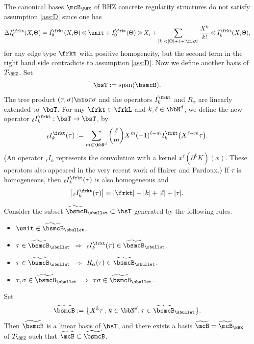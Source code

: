 The canonical bases $\mcB_{\BHZ}$ of BHZ concrete regularity structures do not satisfy assumption \eqref{ass:D} since one has
\[
\Delta I^{\frkt}_0(X_i\Theta) = I^{\frkt}_0(X_i\Theta)\otimes\unit + I^{\frkt}_0(\Theta)\otimes X_i + \sum_{\vert k\vert< \vert\Theta\vert+1+\vert\frkt\vert}\frac{X^k}{k!}\otimes I^{\frkt}_k(X_i\Theta),
\]
for any edge type $\frkt$ with positive homogeneity, but the second term in the right hand side contradicts to assumption \eqref{ass:D}.
Now we define another basis of $T_{\BHZ}$. Set\vspace*{-3pt}
\[
\bsT := \textrm{span}(\bsmcB).
\]
The tree product $(\tau,\sigma)\mto\tau\sigma$ and the operators $I_k^\frkt$ and $R_\alpha$ are linearly extended to~$\bsT$. For any $\frkt\in\frkL$ and $k,\ell\in\bbN^d$, we define the new operator ${}_\ell I_k^\frkt:\bsT\to \bsT$, by\vspace*{-3pt}
\[
{}_\ell I_k^\frkt(\tau) := \sum_{m\in\bbN^d}\binom{\ell}{m}X^m(-1)^{\ell-m}I_k^\frkt\bigl(X^{\ell-m}\tau\bigr).
\]
(An operator ${}_\ell I_k$ represents the convolution with a kernel $x^\ell(\partial^k K)(x)$. These oper\-ators also appeared in the very recent work \cite{HP19} of Hairer and Pardoux.) If $\tau$ is homogeneous, then ${}_\ell I_k^\frkt(\tau)$ is also homogeneous and\vspace*{-3pt}
\[
\big|{}_\ell I_k^\frkt(\tau)\big| = |\frkt| - |k| + |\ell | + |\tau|.
\]

\begin{lem}
Consider the subset $\widetilde{\bsmcB}_\sbullet\subset \bsT$ generated by the following rules.
\begin{itemize}
\item $\unit\in\widetilde{\bsmcB}_\sbullet$.
\item $\tau\in\widetilde{\bsmcB}_\sbullet$ $\Rightarrow$ ${}_\ell I_k^\frkt(\tau)\in\widetilde{\bsmcB}_\sbullet$.
\item $\tau\in\widetilde{\bsmcB}_\sbullet$ $\Rightarrow$ $R_\alpha(\tau)\in\widetilde{\bsmcB}_\sbullet$.
\item $\tau,\sigma\in\widetilde{\bsmcB}_\sbullet$ $\Rightarrow$ $\tau\sigma\in\widetilde{\bsmcB}_\sbullet$.
\end{itemize}
Set\vspace*{-3pt}
\[
\widetilde{\bsmcB} := \big\{X^k\tau\,;\, k\in\bbN^d, \tau\in\widetilde{\bsmcB}_\sbullet\big\}.
\]
Then $\widetilde{\bsmcB}$ is a linear basis of $\bsT$, and there exists a basis $\widetilde{\mcB}=\widetilde{\mcB}_{\BHZ}$ of $T_{\BHZ}$ such that $\widetilde{\mcB}\subset\widetilde{\bsmcB}$.
\end{lem}

